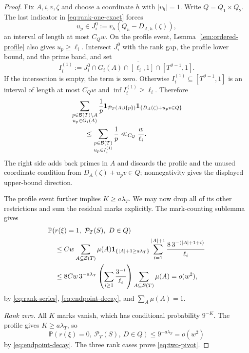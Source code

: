 \documentclass[11pt]{article}
\numberwithin{equation}{section}
\theoremstyle{plain}
\newcommand{\Pp}{\mathbb P}
\newcommand{\1}{\mathbf 1}
\newcommand{\cB}{\mathcal B}
\begin{document}
\begin{proof}
Fix $A,i,v,\zeta$ and choose a coordinate $h$ with $|v_h|=1$.  Write
$Q=Q_1\times Q_2$.  The last indicator in
\eqref{eq:rank-one-exact} forces
\[
 u_p\in J_i^0:=v_h(Q_h-D_{A,h}(\zeta)),
\]
an interval of length at most $C_Qw$.  On the profile event,
Lemma~\ref{lem:ordered-profile} also gives $u_p\ge\ell_i$.  Intersect
$J_i^0$ with the rank gap, the profile lower bound, and the prime band,
and set
\[
 I_i^{(1)}:=
 \overline{
 J_i^0\cap G_i(A)\cap[\ell_i,1]\cap[T^{\vartheta-1},1]}.
\]
If the intersection is empty, the term is zero.  Otherwise
$I_i^{(1)}\subseteq[T^{\vartheta-1},1]$ is an interval of length at most
$C_Qw$ and $\inf I_i^{(1)}\ge\ell_i$.  Therefore
\begin{align}
 &\sum_{\substack{p\in\cB(T)\setminus A\\u_p\in G_i(A)}}\frac1p
   \1_{\mathcal P_T(A\cup\{p\})}
   \1_{\{D_A(\zeta)+u_pv\in Q\}}\notag\\
 &\qquad\le
 \sum_{\substack{p\in\cB(T)\\u_p\in I_i^{(1)}}}\frac1p
 \ll_{C_Q}\frac{w}{\ell_i}.                         \label{eq:one-local-sum}
\end{align}
The right side adds back primes in $A$ and discards the profile and the
unused coordinate condition from $D_A(\zeta)+u_pv\in Q$; nonnegativity
gives the displayed upper-bound direction.

The profile event further implies $K\ge a\lambda_T$.  We may now drop all
of its other restrictions and sum the residual marks explicitly.  The
mark-counting sublemma gives
\begin{align}
 &\Pp(r(\xi)=1,\ \mathcal P_T(S),\ D\in Q)\notag\\
 &\quad\le Cw\sum_{A\subseteq\cB(T)}\mu(A)
   \1_{\{|A|+1\ge a\lambda_T\}}
   \sum_{i=1}^{|A|+1}
   \frac{8\,3^{-(|A|+1+i)}}{\ell_i}\notag\\
 &\quad\le
 8Cw\,3^{-a\lambda_T}
 \left(\sum_{i\ge1}\frac{3^{-i}}{\ell_i}\right)
 \sum_{A\subseteq\cB(T)}\mu(A)
 =o(w^2),                                           \label{eq:rank-one-bound}
\end{align}
by \eqref{eq:rank-series}, \eqref{eq:endpoint-decay}, and
$\sum_A\mu(A)=1$.

\smallskip
\noindent\emph{Rank zero.}
All $K$ marks vanish, which has conditional probability $9^{-K}$.
The profile gives $K\ge a\lambda_T$, so
\begin{equation}\label{eq:rank-zero-bound}
 \Pp(r(\xi)=0,\ \mathcal P_T(S),\ D\in Q)
 \le9^{-a\lambda_T}
 =o(w^2)
\end{equation}
by \eqref{eq:endpoint-decay}.  The three rank cases prove
\eqref{eq:two-pivot}.
\end{proof}
\end{document}
